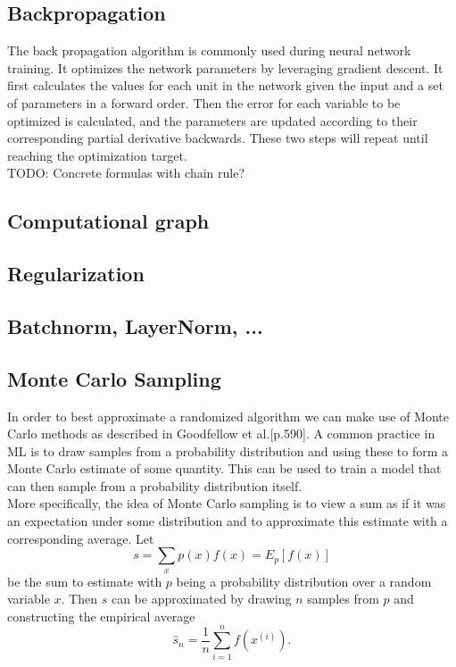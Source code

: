 \subsection{Backpropagation}
The back propagation algorithm is commonly used during neural network training. It optimizes the network parameters by leveraging gradient descent. It first calculates the values for each unit in the network given the input and a set of parameters in a forward order. Then the error for each variable to be optimized is calculated, and the parameters are updated according to their corresponding partial derivative backwards. These two steps will repeat until reaching the optimization target. \\
TODO: Concrete formulas with chain rule?

\subsection{Computational graph}

\subsection{Regularization}

\subsection{Batchnorm, LayerNorm, ...}

\subsection{Monte Carlo Sampling}
In order to best approximate a randomized algorithm we can make use of Monte Carlo methods as described in Goodfellow et al.\cite{Goodfellow-et-al-2016}[p.590]. A common practice in ML is to draw samples from a probability distribution and using these to form a Monte Carlo estimate of some quantity. This can be used to train a model that can then sample from a probability distribution itself. \\
More specifically, the idea of Monte Carlo sampling is to view a sum as if it was an expectation under some distribution and to approximate this estimate with a corresponding average.
Let 
\begin{equation}
    s = \sum_x p(x)f(x)=E_p[f(x)]
\end{equation}
be the sum to estimate with $p$ being a probability distribution over a random variable $x$. Then $s$ can be approximated by drawing $n$ samples from $p$ and constructing the empirical average 
\begin{equation}
    \hat{s}_n=\frac{1}{n}\sum_{i=1}^n f(x^{(i)}).
\end{equation}


